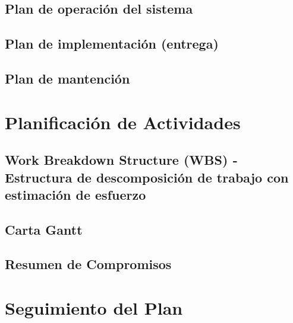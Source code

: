 \documentclass[letterpaper,spanish,10pt]{article}
\begin{document}
\subsection{Plan de operaci\'on del sistema}



\subsection{Plan de implementaci\'on (entrega)}



\subsection{Plan de mantenci\'on}



\section{Planificaci\'on de Actividades}
\subsection{Work Breakdown Structure (WBS) ­ Estructura de descomposici\'on de trabajo
con estimación de esfuerzo}



\subsection{Carta Gantt}



\subsection{Resumen de Compromisos}



\section{Seguimiento del Plan}
\end{document}
